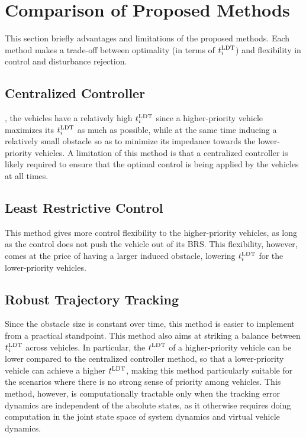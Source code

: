 \section{Comparison of Proposed Methods}
This section briefly  advantages and limitations of the proposed methods. Each method makes a trade-off between optimality (in terms of $t^\text{LDT}_i$) and flexibility in control and disturbance rejection.

\subsection{Centralized Controller}
, the vehicles have a relatively high $t^\text{LDT}_i$ since a higher-priority vehicle maximizes its $t^\text{LDT}_i$ as much as possible, while at the same time inducing a relatively small obstacle so as to minimize its impedance towards the lower-priority vehicles. A limitation of this method is that a centralized controller is likely required to ensure that  the optimal control is being applied by the vehicles at all times.

\subsection{Least Restrictive Control}
This method gives more control flexibility to the higher-priority vehicles, as long as the control does not push the vehicle out of its BRS. This flexibility, however, comes at the price of having a larger induced obstacle, lowering $t^\text{LDT}_i$ for the lower-priority vehicles.  

\subsection{Robust Trajectory Tracking}
Since the obstacle size is constant over time, this method is easier to implement from a practical standpoint. This method also aims at striking a balance between $t^\text{LDT}_i$ across vehicles. In particular, the $t^\text{LDT}$ of a higher-priority vehicle can be lower compared to the centralized controller method, so that a lower-priority vehicle can achieve a higher $t^\text{LDT}$, making this method particularly suitable for the scenarios where there is no strong sense of priority among vehicles. This method, however, is computationally tractable only when the tracking error dynamics are independent of the absolute states, as it otherwise requires doing computation in the joint state space of system dynamics and virtual vehicle dynamics. 